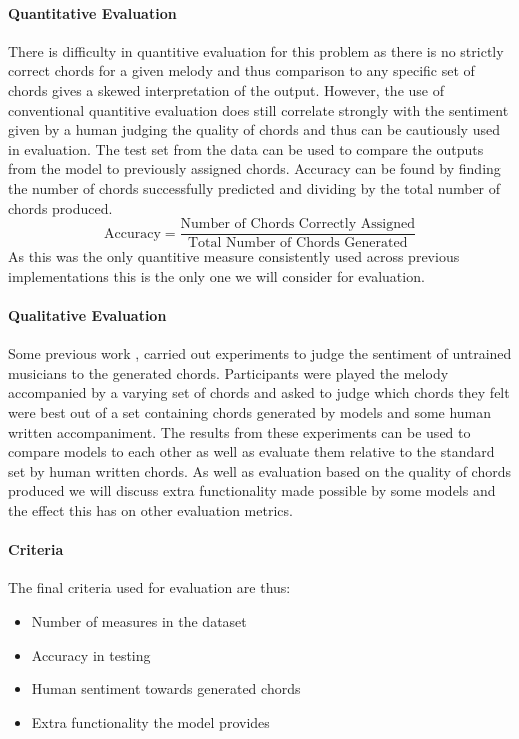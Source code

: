 \paragraph{Quantitative Evaluation}
There is difficulty in quantitive evaluation for this problem as there is no strictly correct chords for a given melody and thus comparison to any specific set of chords gives a skewed interpretation of the output.
However, the use of conventional quantitive evaluation does still correlate strongly with the sentiment given by a human judging the quality of chords and thus can be cautiously used in evaluation.
The test set from the data can be used to compare the outputs from the model to previously assigned chords. Accuracy can be found by finding the number of chords successfully predicted and dividing by the total number of chords produced.
\begin{equation}
    \text{Accuracy} = \frac{\text{Number of Chords Correctly Assigned}}{\text{Total Number of Chords Generated}}
\end{equation}
As this was the only quantitive measure consistently used across previous implementations this is the only one we will consider for evaluation.

\paragraph{Qualitative Evaluation}
Some previous work \cite{MySong}, \cite{BLSTM} carried out experiments to judge the sentiment of untrained musicians to the generated chords.
Participants were played the melody accompanied by a varying set of chords and asked to judge which chords they felt were best out of a set containing chords generated by models and some human written accompaniment.
The results from these experiments can be used to compare models to each other as well as evaluate them relative to the standard set by human written chords.
As well as evaluation based on the quality of chords produced we will discuss extra functionality made possible by some models and the effect this has on other evaluation metrics.

\paragraph{Criteria}
The final criteria used for evaluation are thus:
\begin{itemize}
    \item Number of measures in the dataset
    \item Accuracy in testing
    \item Human sentiment towards generated chords
    \item Extra functionality the model provides
\end{itemize}
